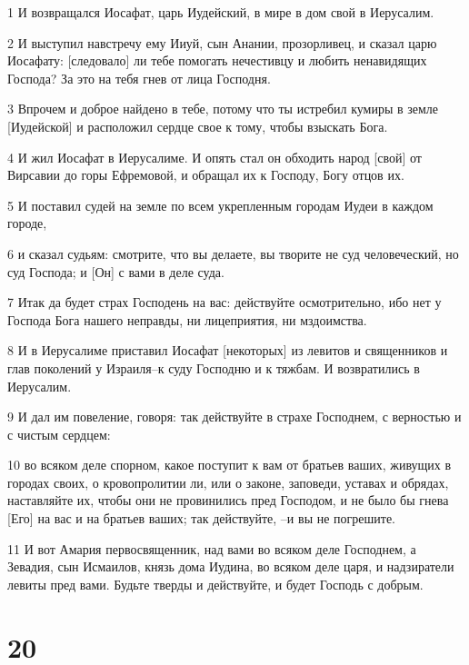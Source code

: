 \par 1 И возвращался Иосафат, царь Иудейский, в мире в дом свой в Иерусалим.
\par 2 И выступил навстречу ему Ииуй, сын Анании, прозорливец, и сказал царю Иосафату: [следовало] ли тебе помогать нечестивцу и любить ненавидящих Господа? За это на тебя гнев от лица Господня.
\par 3 Впрочем и доброе найдено в тебе, потому что ты истребил кумиры в земле [Иудейской] и расположил сердце свое к тому, чтобы взыскать Бога.
\par 4 И жил Иосафат в Иерусалиме. И опять стал он обходить народ [свой] от Вирсавии до горы Ефремовой, и обращал их к Господу, Богу отцов их.
\par 5 И поставил судей на земле по всем укрепленным городам Иудеи в каждом городе,
\par 6 и сказал судьям: смотрите, что вы делаете, вы творите не суд человеческий, но суд Господа; и [Он] с вами в деле суда.
\par 7 Итак да будет страх Господень на вас: действуйте осмотрительно, ибо нет у Господа Бога нашего неправды, ни лицеприятия, ни мздоимства.
\par 8 И в Иерусалиме приставил Иосафат [некоторых] из левитов и священников и глав поколений у Израиля--к суду Господню и к тяжбам. И возвратились в Иерусалим.
\par 9 И дал им повеление, говоря: так действуйте в страхе Господнем, с верностью и с чистым сердцем:
\par 10 во всяком деле спорном, какое поступит к вам от братьев ваших, живущих в городах своих, о кровопролитии ли, или о законе, заповеди, уставах и обрядах, наставляйте их, чтобы они не провинились пред Господом, и не было бы гнева [Его] на вас и на братьев ваших; так действуйте, --и вы не погрешите.
\par 11 И вот Амария первосвященник, над вами во всяком деле Господнем, а Зевадия, сын Исмаилов, князь дома Иудина, во всяком деле царя, и надзиратели левиты пред вами. Будьте тверды и действуйте, и будет Господь с добрым.

\chapter{20}

